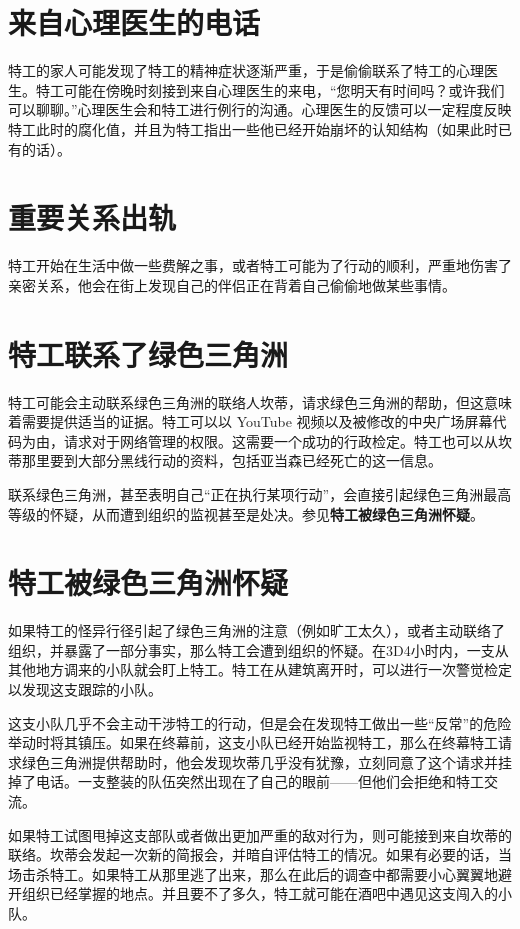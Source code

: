 \section{来自心理医生的电话}

特工的家人可能发现了特工的精神症状逐渐严重，于是偷偷联系了特工的心理医生。特工可能在傍晚时刻接到来自心理医生的来电，“您明天有时间吗？或许我们可以聊聊。”心理医生会和特工进行例行的沟通。心理医生的反馈可以一定程度反映特工此时的腐化值，并且为特工指出一些他已经开始崩坏的认知结构（如果此时已有的话）。

\section{重要关系出轨}

特工开始在生活中做一些费解之事，或者特工可能为了行动的顺利，严重地伤害了亲密关系，他会在街上发现自己的伴侣正在背着自己偷偷地做某些事情。

\section{特工联系了绿色三角洲}
特工可能会主动联系绿色三角洲的联络人坎蒂，请求绿色三角洲的帮助，但这意味着需要提供适当的证据。特工可以以 YouTube 视频以及被修改的中央广场屏幕代码为由，请求对于网络管理的权限。这需要一个成功的行政检定。特工也可以从坎蒂那里要到大部分黑线行动的资料，包括亚当森已经死亡的这一信息。

联系绿色三角洲，甚至表明自己“正在执行某项行动”，会直接引起绿色三角洲最高等级的怀疑，从而遭到组织的监视甚至是处决。参见\textbf{特工被绿色三角洲怀疑}。

\section{特工被绿色三角洲怀疑}

如果特工的怪异行径引起了绿色三角洲的注意（例如旷工太久），或者主动联络了组织，并暴露了一部分事实，那么特工会遭到组织的怀疑。在3D4小时内，一支从其他地方调来的小队就会盯上特工。特工在从建筑离开时，可以进行一次警觉检定以发现这支跟踪的小队。

这支小队几乎不会主动干涉特工的行动，但是会在发现特工做出一些“反常”的危险举动时将其镇压。如果在终幕前，这支小队已经开始监视特工，那么在终幕特工请求绿色三角洲提供帮助时，他会发现坎蒂几乎没有犹豫，立刻同意了这个请求并挂掉了电话。一支整装的队伍突然出现在了自己的眼前——但他们会拒绝和特工交流。

如果特工试图甩掉这支部队或者做出更加严重的敌对行为，则可能接到来自坎蒂的联络。坎蒂会发起一次新的简报会，并暗自评估特工的情况。如果有必要的话，当场击杀特工。如果特工从那里逃了出来，那么在此后的调查中都需要小心翼翼地避开组织已经掌握的地点。并且要不了多久，特工就可能在酒吧中遇见这支闯入的小队。


